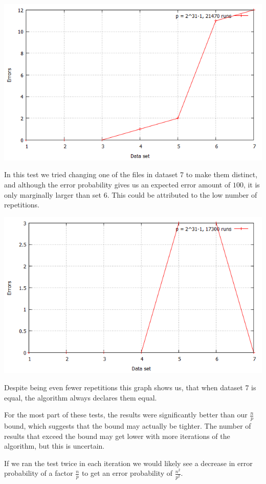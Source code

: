 \documentclass[article,a4paper,oneside]{article}
\newcommand{\+}[1]{\ensuremath{\boldsymbol{#1}}}
\begin{document}
\begin{center}
\includegraphics[scale=0.3]{fingerprint_johan.png}\\
\end{center}
In this test we tried changing one of the files in dataset 7 to make them distinct, and although the error probability gives us an expected error amount of $100$, it is only marginally larger than set 6. This could be attributed to the low number of repetitions.

\begin{center}
\includegraphics[scale=0.3]{fingerprint_bo.png}\\
\end{center}
Despite being even fewer repetitions this graph shows us, that when dataset 7 is equal, the algorithm always declares them equal.

For the most part of these tests, the results were significantly better than our $\frac{n}{p}$ bound, which suggests that the bound may actually be tighter. The number of results that exceed the bound may get lower with more iterations of the algorithm, but this is uncertain.

If we ran the test twice in each iteration we would likely see a decrease in error probability of a factor $\frac{n}{p}$ to get an error probability of $\frac{n^2}{p^2}$.
\end{document}
